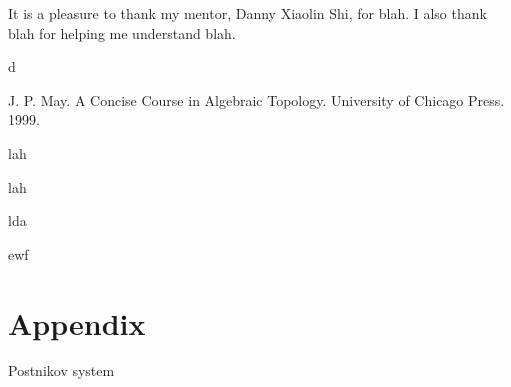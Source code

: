\documentclass[psamsfonts]{amsart}
\theoremstyle{definition}
\theoremstyle{remark}
\numberwithin{equation}{section}
\begin{document}
It is a pleasure to thank my mentor, Danny Xiaolin Shi, for blah. I also thank blah for helping 
me understand blah.

\newpage
\begin{thebibliography}{2}

 d


J. P. May.
A Concise Course in Algebraic Topology.
University of Chicago Press. 1999.

 lah

 lah

 lda

 ewf

\end{thebibliography}

\section*{Appendix}

Postnikov system
\end{document}
